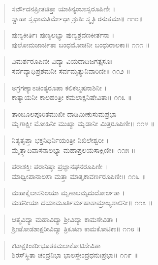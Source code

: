 \begin{verse}
ಸರ್ವೌದನಪ್ರೀತಚಿತ್ತಾ ಯಾಕಿನ್ಯಂಬಾಸ್ವರೂಪಿಣೀ ।\\ಸ್ವಾಹಾ ಸ್ವಧಾಮತಿರ್ಮೇಧಾ ಶ್ರುತಿಃ ಸ್ಮೃತಿ  ರನುತ್ತಮಾ\num{॥ ೧೧೦॥}
\end{verse}

\begin{verse}
ಪುಣ್ಯಕೀರ್ತಿಃ ಪುಣ್ಯಲಭ್ಯಾ ಪುಣ್ಯಶ್ರವಣಕೀರ್ತನಾ ।\\ಪುಲೋಮಜಾರ್ಚಿತಾ ಬಂಧಮೋಚನೀ ಬಂಧುರಾಲಕಾ\num{॥ ೧೧೧ ॥}
\end{verse}

\begin{verse}
ವಿಮರ್ಶರೂಪಿಣೀ ವಿದ್ಯಾ ವಿಯದಾದಿಜಗತ್ಪ್ರಸೂಃ \\ಸರ್ವವ್ಯಾಧಿಪ್ರಶಮನೀ ಸರ್ವಮೃತ್ಯುನಿವಾರಿಣೀ\num{॥ ೧೧೨ ॥}
\end{verse}

\begin{verse}
ಅಗ್ರಗಣ್ಯಾಽಚಿಂತ್ಯರೂಪಾ ಕಲಿಕಲ್ಮಷನಾಶಿನೀ ।\\ಕಾತ್ಯಾಯನೀ ಕಾಲಹಂತ್ರೀ ಕಮಲಾಕ್ಷನಿಷೇವಿತಾ\num{॥ ೧೧೩ ॥}
\end{verse}

\begin{verse}
ತಾಂಬೂಲಪೂರಿತಮುಖೀ ದಾಡಿಮೀಕುಸುಮಪ್ರಭಾ \\ಮೃಗಾಕ್ಷೀ ಮೋಹಿನೀ ಮುಖ್ಯಾ ಮೃಡಾನೀ ಮಿತ್ರರೂಪಿಣೀ\num{॥ ೧೧೪ ॥}
\end{verse}

\begin{verse}
ನಿತ್ಯತೃಪ್ತಾ ಭಕ್ತನಿಧಿರ್ನಿಯಂತ್ರೀ ನಿಖಿಲೇಶ್ವರೀ ।\\ಮೈತ್ರ್ಯಾದಿವಾಸನಾಲಭ್ಯಾ  ಮಹಾಪ್ರಲಯಸಾಕ್ಷಿಣೀ\num{॥ ೧೧೫ ॥}
\end{verse}

\begin{verse}
ಪರಾಶಕ್ತಿಃ ಪರಾನಿಷ್ಠಾ ಪ್ರಜ್ಞಾನಘನರೂಪಿಣೀ ।\\ಮಾಧ್ವೀಪಾನಾಲಸಾ ಮತ್ತಾ ಮಾತೃಕಾವರ್ಣರೂಪಿಣೀ\num{॥ ೧೧೬ ॥}
\end{verse}

\begin{verse}
ಮಹಾಕೈಲಾಸನಿಲಯಾ ಮೃಣಾಲಮೃದುದೋರ್ಲತಾ ।\\ಮಹನೀಯಾ  ದಯಾಮೂರ್ತಿರ್ಮಹಾಸಾಮ್ರಾಜ್ಯಶಾಲಿನೀ\num{॥ ೧೧೭ ॥}
\end{verse}

\begin{verse}
ಆತ್ಮವಿದ್ಯಾ ಮಹಾವಿದ್ಯಾ ಶ್ರೀವಿದ್ಯಾ ಕಾಮಸೇವಿತಾ ।\\ಶ್ರೀಷೋಡಶಾಕ್ಷರೀವಿದ್ಯಾ ತ್ರಿಕೂಟಾ ಕಾಮಕೋಟಿಕಾ\num{॥ ೧೧೮ ॥}
\end{verse}

\begin{verse}
ಕಟಾಕ್ಷಕಿಂಕರೀಭೂತಕಮಲಾಕೋಟಿಸೇವಿತಾ \\ಶಿರಸ್​ಸ್ಥಿತಾ ಚಂದ್ರನಿಭಾ ಭಾಲಸ್ಥೇಂದ್ರಧನುಃಪ್ರಭಾ\num{॥ ೧೧೯ ॥}
\end{verse}

